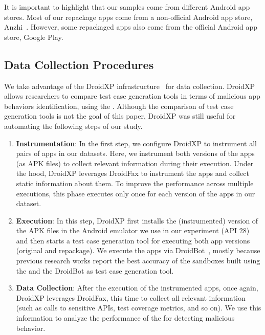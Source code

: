 It is important to highlight that our samples come from different Android app stores. Most of our repackage apps come from a non-official
Android app store, Anzhi~\cite{anzhi}. However, some repackaged apps also come from the official Android app store, Google Play.


\subsection{Data Collection Procedures} \label{sec:dataCollectionProc}

We take advantage of the DroidXP infrastructure~\cite{DBLP:conf/scam/CostaMCMVBC20}
for data collection. DroidXP allows researchers to compare 
test case generation tools in terms of malicious app behaviors identification, using the \mas. Although the comparison of test
case generation tools is not the goal of this paper, DroidXP
was still useful for automating the following steps of our study.

\begin{enumerate}[S1]
 \item \textbf{Instrumentation}: In the first step,
we configure DroidXP to instrument all pairs of apps in our datasets.
Here, we instrument both versions of the apps (as APK files) to collect relevant information during their execution. Under the hood, DroidXP leverages
DroidFax to instrument the apps and collect static
information about them. To improve the performance across multiple executions,
this phase executes only once for each version of the apps in our dataset.

\item \textbf{Execution}: In this step, DroidXP first installs the (instrumented) version of the APK files in the Android emulator we use in our experiment (API 28) and then starts a test case generation tool for executing both app versions (original and repackage). We execute the apps via DroidBot~\cite{DBLP:conf/icse/LiYGC17}, mostly because previous research works report the best accuracy of the sandboxes built using the \mas and the DroidBot as test case generation tool. 


\item \textbf{Data Collection}: After the execution of the instrumented apps, once again, DroidXP leverages DroidFax, this time to collect all relevant information (such as calls to sensitive APIs, test coverage metrics, and so on). We use this information to analyze the performance of the \mas for detecting malicious behavior.
\end{enumerate}

